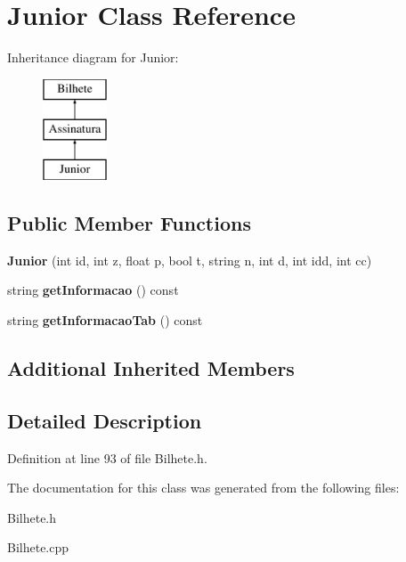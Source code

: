 \hypertarget{classJunior}{}\section{Junior Class Reference}
\label{classJunior}
Inheritance diagram for Junior\+:\begin{figure}[H]
\begin{center}
\leavevmode
\includegraphics[height=3.000000cm]{classJunior}
\end{center}
\end{figure}
\subsection*{Public Member Functions}
\begin{DoxyCompactItemize}
\item 
\mbox{\label{classJunior_ac9112a5facf0c3976d9b65ade0a77810}} 
{\bfseries Junior} (int id, int z, float p, bool t, string n, int d, int idd, int cc)
\item 
\mbox{\label{classJunior_ab001f11dbf90d26e6e4cd4a1de5d20f0}} 
string {\bfseries get\+Informacao} () const
\item 
\mbox{\label{classJunior_a2ffa5c77660a02983256cf98c93c4613}} 
string {\bfseries get\+Informacao\+Tab} () const
\end{DoxyCompactItemize}
\subsection*{Additional Inherited Members}


\subsection{Detailed Description}


Definition at line 93 of file Bilhete.\+h.



The documentation for this class was generated from the following files\+:\begin{DoxyCompactItemize}
\item 
Bilhete.\+h\item 
Bilhete.\+cpp\end{DoxyCompactItemize}
